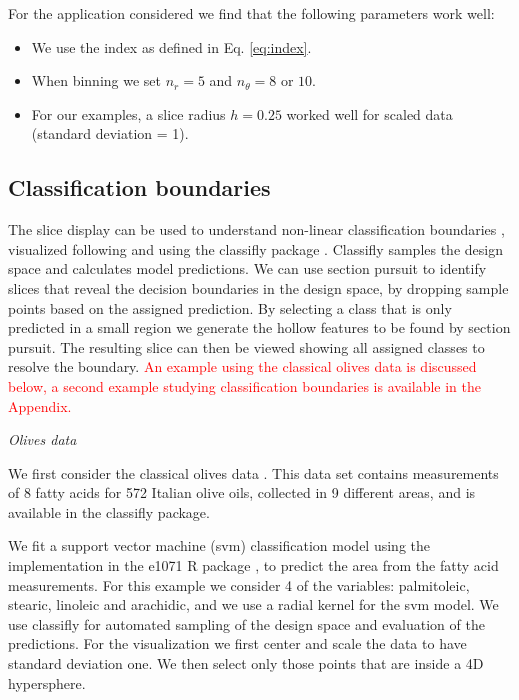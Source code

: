\documentclass[]{interact}
\theoremstyle{plain}%
\theoremstyle{definition}
\theoremstyle{remark}
\def\tightlist{}
\begin{document}
For the application considered we find that the following parameters
work well:

\begin{itemize}
\tightlist
\item
  We use the index as defined in Eq. \ref{eq:index}.
\item
  When binning we set \(n_r=5\) and \(n_{\theta}=8\) or \(10\).
\item
  For our examples, a slice radius \(h=0.25\) worked well for scaled
  data (standard deviation = 1).
\end{itemize}

\hypertarget{classification-boundaries}{%
\subsection{Classification boundaries}\label{classification-boundaries}}

The slice display can be used to understand non-linear classification
boundaries \citep{laa2019slice}, visualized following \citet{sam.11271}
and using the classifly package \citep{classifly}. Classifly samples the
design space and calculates model predictions. We can use section
pursuit to identify slices that reveal the decision boundaries in the
design space, by dropping sample points based on the assigned
prediction. By selecting a class that is only predicted in a small
region we generate the hollow features to be found by section pursuit.
The resulting slice can then be viewed showing all assigned classes to
resolve the boundary.
\textcolor{red}{An example using the classical olives data is discussed below, a second example studying classification boundaries is available in the Appendix.}

\emph{Olives data}

We first consider the classical olives data \citep{olives}. This data
set contains measurements of 8 fatty acids for 572 Italian olive oils,
collected in 9 different areas, and is available in the classifly
package.

We fit a support vector machine (svm) classification model using the
implementation in the e1071 R package \citep{e1071}, to predict the area
from the fatty acid measurements. For this example we consider 4 of the
variables: palmitoleic, stearic, linoleic and arachidic, and we use a
radial kernel for the svm model. We use classifly for automated sampling
of the design space and evaluation of the predictions. For the
visualization we first center and scale the data to have standard
deviation one. We then select only those points that are inside a 4D
hypersphere.
\end{document}
